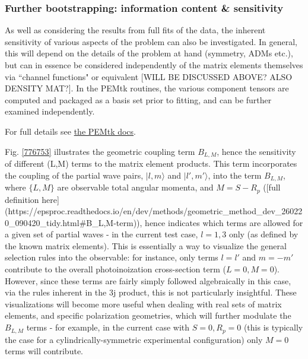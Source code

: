 \subsubsection{Further bootstrapping: information content \& sensitivity}

As well as considering the results from full fits of the data, the inherent sensitivity of various aspects of the problem can also be investigated. In general, this will depend on the details of the problem at hand (symmetry, ADMs etc.), but can in essence be considered independently of the matrix elements themselves via ``channel functions" or equivalent [WILL BE DISCUSSED ABOVE? ALSO DENSITY MAT?]. In the PEMtk routines, the various component tensors are computed and packaged as a basis set prior to fitting, and can be further examined independently. 

For full details see \href{https://pemtk.readthedocs.io/en/latest/fitting/PEMtk_fitting_basis-set_demo_050621-full.html}{the PEMtk docs}.

Fig. \ref{776753} illustrates the geometric coupling term $B_{L,M}$, hence the sensitivity of different (L,M) terms to the matrix element products. This term incorporates the coupling of the partial wave pairs, $|l,m\rangle$ and $|l',m'\rangle$, into the term $B_{L,M}$, where $\{L,M\}$ are observable total angular momenta, and $M = S-R_{p}$ ([full definition here](https://epsproc.readthedocs.io/en/dev/methods/geometric_method_dev_260220_090420_tidy.html#B_{L,M}-term)), hence indicates which terms are allowed for a given set of partial waves - in the current test case, $l=1,3$ only (as defined by the known matrix elements). This is essentially a way to visualize the general selection rules into the observable: for instance, only terms $l=l'$ and $m=-m'$ contribute to the overall photoinoization cross-section term ($L=0, M=0$). However, since these terms are fairly simply followed algebraically in this case, via the rules inherent in the 3j product, this is not particularly insightful. These visualizations will become more useful when dealing with real sets of matrix elements, and specific polarization geometries, which will further modulate the $B_{L,M}$ terms - for example, in the current case with $S=0, R_p=0$ (this is typically the case for a cylindrically-symmetric experimental configuration) only $M=0$ terms will contribute.

